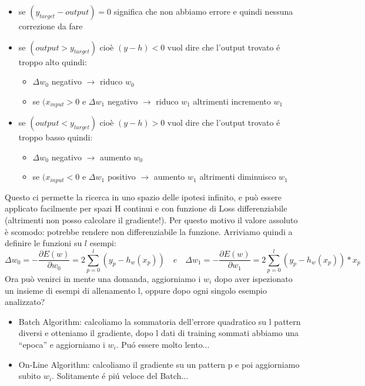 \documentclass{article}
\begin{document}
\begin{itemize}
    \item se $(y_{target}-output)=0$ significa che non abbiamo errore e quindi nessuna correzione da fare
    \item se $(output>y_{target})$ cioè $(y-h)<0$ vuol dire che l'output trovato é troppo alto quindi:
        \begin{itemize}
            \item $\Delta w_0$ negativo $\rightarrow$ riduco $w_0$
            \item se $(x_{input}>0$ e $\Delta w_1$ negativo $\rightarrow$ riduco $w_1$ altrimenti incremento $w_1$
        \end{itemize}
    \item se $(output<y_{target})$ cioè $(y-h)>0$ vuol dire che l'output trovato é troppo basso quindi: %
        \begin{itemize}
            \item $\Delta w_0$ negativo $\rightarrow$ aumento $w_0$
            \item se $(x_{input}<0$ e $\Delta w_1$ positivo $\rightarrow$ aumento $w_1$ altrimenti diminuisco $w_1$
        \end{itemize}
\end{itemize}
Questo ci permette la ricerca in uno spazio delle ipotesi infinito, e può essere applicato facilmente per spazi H continui e con funzione di Loss differenziabile (altrimenti non posso calcolare il gradiente!). Per questo motivo il valore assoluto è scomodo: potrebbe rendere non differenziabile la funzione. \newline
Arriviamo quindi a definire le funzioni su $l$  esempi:
\begin{equation}
    \Delta w_0 = - \frac{\partial E(w)}{\partial w_0} = 2 \sum_{p=0}^l (y_p - h_w(x_p)) \quad e \quad \Delta w_1 = - \frac{\partial E(w)}{\partial w_1} = 2 \sum_{p=0}^l (y_p - h_w(x_p)) * x_p
\end{equation}
Ora può venirci in mente una domanda, aggiorniamo i $w_i$ dopo aver ispezionato un insieme di esempi di allenamento l, oppure dopo ogni singolo esempio analizzato?
\begin{itemize}
    \item Batch Algorithm: calcoliamo la sommatoria dell'errore quadratico su l pattern diversi e otteniamo il gradiente, dopo l dati di training sommati abbiamo una “epoca” e aggiorniamo i $w_i$. Puó essere molto lento...
    \item On-Line Algorithm: calcoliamo il gradiente su un pattern p e poi aggiorniamo subito $w_i$. Solitamente é piú veloce del Batch...
\end{itemize}
\end{document}
